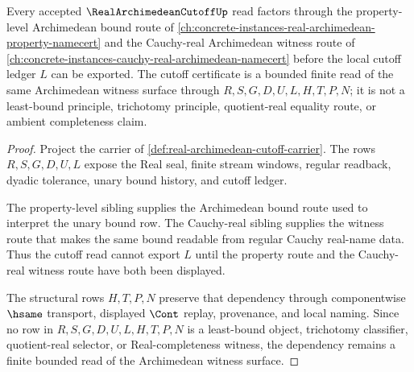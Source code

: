 \begin{theorem}
\label{thm:real-archimedean-cutoff-sibling-dependency}
Every accepted $\RealArchimedeanCutoffUp$ read factors through the property-level Archimedean bound route of \autoref{ch:concrete-instances-real-archimedean-property-namecert} and the Cauchy-real Archimedean witness route of \autoref{ch:concrete-instances-cauchy-real-archimedean-namecert} before the local cutoff ledger $L$ can be exported. The cutoff certificate is a bounded finite read of the same Archimedean witness surface through $R,S,G,D,U,L,H,T,P,N$; it is not a least-bound principle, trichotomy principle, quotient-real equality route, or ambient completeness claim.
\end{theorem}
\begin{proof}
Project the carrier of \autoref{def:real-archimedean-cutoff-carrier}. The rows $R,S,G,D,U,L$ expose the Real seal, finite stream windows, regular readback, dyadic tolerance, unary bound history, and cutoff ledger.

The property-level sibling supplies the Archimedean bound route used to interpret the unary bound row. The Cauchy-real sibling supplies the witness route that makes the same bound readable from regular Cauchy real-name data. Thus the cutoff read cannot export $L$ until the property route and the Cauchy-real witness route have both been displayed.

The structural rows $H,T,P,N$ preserve that dependency through componentwise $\hsame$ transport, displayed $\Cont$ replay, provenance, and local naming. Since no row in $R,S,G,D,U,L,H,T,P,N$ is a least-bound object, trichotomy classifier, quotient-real selector, or Real-completeness witness, the dependency remains a finite bounded read of the Archimedean witness surface.
\end{proof}


\begin{closurestatus}{\RealArchimedeanCutoffUp}
  \theoryclosure{\seedClosure}
  \formalstatus{\unformalizedV}
\end{closurestatus}
